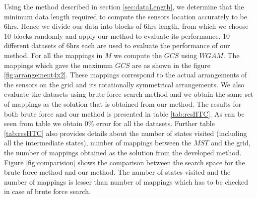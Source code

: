 Using the method described in section \ref{sec:dataLength}, we determine that the minimum data length required to compute the sensors location accurately to be 6hrs.
Hence we divide our data into blocks of 6hrs length, from which we choose 10 blocks randomly and apply our method to evaluate its performance.
10 different datasets of 6hrs each are used to evaluate the performance of our method.
For all the mappings in $M$ we compute the $GCS$ using $WGAM$. The mappings which gave the maximum $GCS$ are as shown in the figure \ref{fig:arrangement4x2}.
These mappings correspond to the actual arrangements of the sensors on the grid and its rotationally symmetrical arrangements.
We also evaluate the datasets using brute force search method and we obtain the same set of mappings as the solution that is obtained from our method. The results for both brute force and our method is presented in table \ref{tab:resHTC}.
As can be seen from table we obtain 0\% error for all the datasets. 
Further table \ref{tab:resHTC} also provides details about the number of states visited (including all the intermediate states), number of mappings between the $MST$ and the grid, the number of mappings obtained as the solution from the developed method. 
Figure \ref{fig:comparision} shows the comparison between the search space for the brute force method and our method. 
The number of states visited and the number of mappings is lesser than number of  mappings which has to be checked in case of brute force search. 
